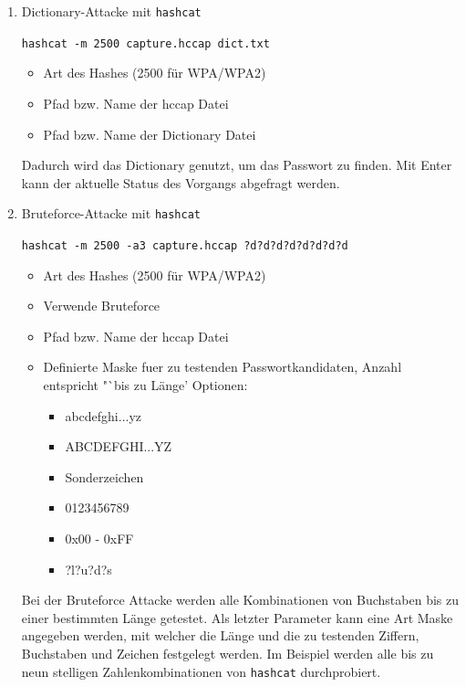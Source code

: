 	\begin{enumerate}

	\item Dictionary-Attacke mit \colorbox{altgray}{\lstinline|hashcat|}

	\colorbox{altgray}{\lstinline|hashcat -m 2500 capture.hccap dict.txt|}
	\begin{itemize}
		\item {} Art des Hashes (2500 für WPA/WPA2)
		\item {}  Pfad bzw. Name der hccap Datei
		\item {} Pfad bzw. Name der Dictionary Datei
	\end{itemize}

	Dadurch wird das Dictionary genutzt, um das Passwort zu finden. Mit Enter kann der aktuelle Status des Vorgangs abgefragt werden.
	\\
	\item Bruteforce-Attacke mit \colorbox{altgray}{\lstinline|hashcat|}

	\colorbox{altgray}{\lstinline|hashcat -m 2500 -a3 capture.hccap ?d?d?d?d?d?d?d?d|}\newline
	\begin{itemize}
		\item {} Art des Hashes (2500 für WPA/WPA2)
		\item {} Verwende Bruteforce
		\item {}  Pfad bzw. Name der hccap Datei
		\item {} Definierte Maske fuer zu testenden Passwortkandidaten, Anzahl entspricht "`bis zu Länge'\newline
			Optionen:
			\begin{itemize}
				\item {} abcdefghi...yz
				\item {} ABCDEFGHI...YZ
				\item {} Sonderzeichen
				\item {} 0123456789
				\item {} 0x00 - 0xFF
				\item {} ?l?u?d?s
			\end{itemize}
	\end{itemize}

	Bei der Bruteforce Attacke werden alle Kombinationen von Buchstaben bis zu einer bestimmten Länge getestet. Als letzter Parameter kann eine Art Maske angegeben werden, mit welcher die Länge und die zu testenden Ziffern, Buchstaben und Zeichen festgelegt werden. Im Beispiel werden alle bis zu neun stelligen Zahlenkombinationen von \colorbox{altgray}{\lstinline|hashcat|} durchprobiert.\newline


\end{enumerate}
